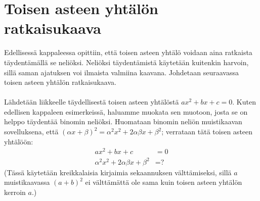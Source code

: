 \section{Toisen asteen yhtälön ratkaisukaava}


Edellisessä kappaleessa opittiin, että toisen asteen yhtälö voidaan aina ratkaista täydentämällä se neliöksi.
Neliöksi täydentämistä käytetään kuitenkin harvoin, sillä saman ajatuksen voi ilmaista valmiina kaavana.
Johdetaan seuraavassa toisen asteen yhtälön ratkaisukaava. \\ \\

Lähdetään liikkeelle täydellisestä toisen asteen yhtälöstä $ax^2+bx+c=0$. Kuten edellisen kappaleen esimerkeissä, haluamme muokata sen muotoon, josta se on helppo täydentää binomin neliöksi. Huomataan binomin neliön muistikaavan sovelluksena, että $(\alpha x + \beta)^2 = \alpha^2 x^2 + 2\alpha\beta x +\beta^2$; verrataan tätä toisen asteen yhtälöön:
\begin{align*}
ax^2+bx+c &= 0 \\
\alpha^2 x^2 + 2\alpha\beta x +\beta^2 &= \text{?}
\end{align*}
(Tässä käytetään kreikkalaisia kirjaimia sekaannuksen välttämiseksi, sillä $a$ muistikaavassa $(a + b)^2$ ei välttämättä ole sama kuin toisen asteen yhtälön kerroin $a$.)

